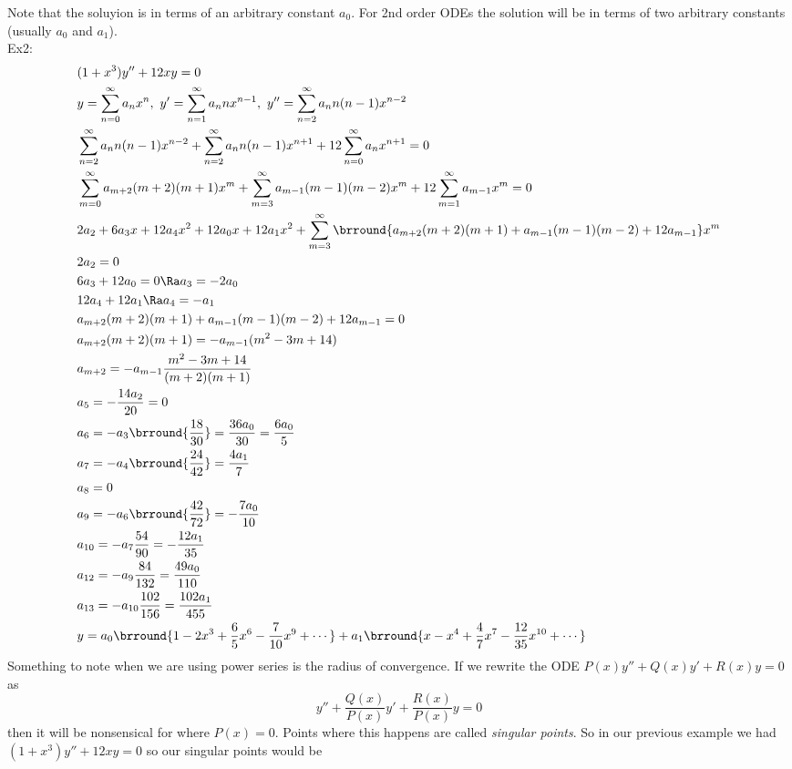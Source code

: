 Note that the soluyion is in terms of an arbitrary constant $a_0$. For 2nd order ODEs the solution will be in terms of two arbitrary constants (usually $a_0$ and $a_1$).\\
Ex2:
\begin{align*}
    &(1+x^3)y''+12xy=0\\
    &y=\sum_{n=0}^\infty a_nx^n,\ y'=\sum_{n=1}^\infty a_nnx^{n-1},\ y''=\sum_{n=2}^\infty a_nn(n-1)x^{n-2}\\
    &\sum_{n=2}^\infty a_nn(n-1)x^{n-2}+\sum_{n=2}^\infty a_nn(n-1)x^{n+1}+12\sum_{n=0}^\infty a_nx^{n+1}=0\\
    &\sum_{m=0}^\infty a_{m+2}(m+2)(m+1)x^m+\sum_{m=3}^\infty a_{m-1}(m-1)(m-2)x^m+12\sum_{m=1}^\infty a_{m-1}x^m=0\\
    &2a_2+6a_3x+12a_4x^2+12a_0x+12a_1x^2+\sum_{m=3}^\infty\brround{a_{m+2}(m+2)(m+1)+a_{m-1}(m-1)(m-2)+12a_{m-1}}x^m\\
    &2a_2=0\\
    &6a_3+12a_0=0\Ra a_3=-2a_0\\
    &12a_4+12a_1\Ra a_4=-a_1\\
    &a_{m+2}(m+2)(m+1)+a_{m-1}(m-1)(m-2)+12a_{m-1}=0\\
    &a_{m+2}(m+2)(m+1)=-a_{m-1}(m^2-3m+14)\\
    &a_{m+2}=-a_{m-1}\frac{m^2-3m+14}{(m+2)(m+1)}\\
    &a_5=-\frac{14a_2}{20}=0\\
    &a_6=-a_3\brround{\frac{18}{30}}=\frac{36a_0}{30}=\frac{6a_0}{5}\\
    &a_7=-a_4\brround{\frac{24}{42}}=\frac{4a_1}{7}\\
    &a_8=0\\
    &a_9=-a_6\brround{\frac{42}{72}}=-\frac{7a_0}{10}\\
    &a_{10}=-a_7\frac{54}{90}=-\frac{12a_1}{35}\\
    &a_{12}=-a_9\frac{84}{132}=\frac{49a_0}{110}\\
    &a_{13}=-a_{10}\frac{102}{156}=\frac{102a_1}{455}\\
    &y=a_0\brround{1-2x^3+\frac{6}{5}x^6-\frac{7}{10}x^9+\cdots}+a_1\brround{x-x^4+\frac{4}{7}x^7-\frac{12}{35}x^{10}+\cdots}
\end{align*}
Something to note when we are using power series is the radius of convergence. If we rewrite the ODE $P(x)y''+Q(x)y'+R(x)y=0$ as
$$y''+\frac{Q(x)}{P(x)}y'+\frac{R(x)}{P(x)}y=0$$
then it will be nonsensical for where $P(x)=0$. Points where this happens are called \textit{singular points}. So in our previous example we had $(1+x^3)y''+12xy=0$ so our singular points would be
